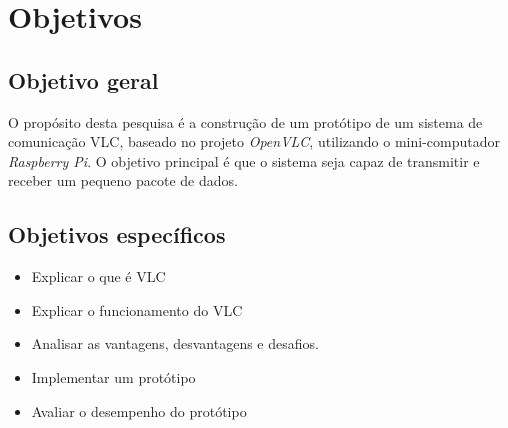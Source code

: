 \chapter{Objetivos}
\section{Objetivo geral}

O propósito desta pesquisa é a construção de um protótipo de um sistema de
comunicação VLC, baseado no projeto \textit{OpenVLC}, utilizando o mini-computador \textit{Raspberry Pi}. O objetivo principal é que o sistema seja capaz de transmitir e receber um pequeno pacote de dados.

\section{Objetivos específicos}

\begin{itemize}

  \item Explicar o que é VLC
  \item Explicar o funcionamento do VLC
  \item Analisar as vantagens, desvantagens e desafios.
  \item Implementar um protótipo
  \item Avaliar o desempenho do protótipo

\end{itemize}


